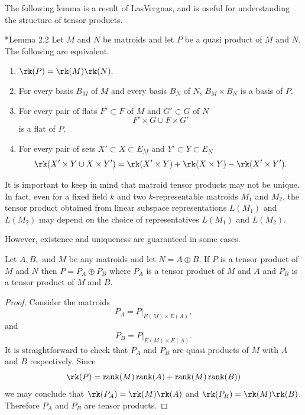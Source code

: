     The following lemma is a result of LasVergnas, and is useful for understanding the structure of tensor products.
    \begin{lemma}\label{lem:tensorCharacterizations}\cite{LV81}*{Lemma 2.2}
    Let $M$ and $N$ be matroids and let $P$ be a quasi product of $M$ and $N$. The following are equivalent.
    \begin{enumerate}
        \item $\rk(P)=\rk(M)\rk(N).$
        \item For every basis $B_M$ of $M$ and every basis $B_N$ of $N$, $B_M\times B_N$ is a basis of $P$.
        \item For every pair of flats $F'\subset F$ of $M$ and $G'\subset G$ of $N$ 
        $$F'\times G \cup F\times G'$$
        is a flat of $P$.
        \item For every pair of sets $X'\subset X\subset E_M$ and $Y'\subset Y\subset E_N$
        $$\rk(X'\times Y\cup X\times Y')= \rk(X'\times Y)+\rk(X\times Y)- \rk(X'\times Y').$$
    \end{enumerate}
    \end{lemma}
    
    It is important to keep in mind that matroid tensor products may not be unique. In fact, even for a fixed field $k$ and two $k$-representable matroids $M_1$ and $M_2$, the tensor product obtained from linear subspace representations $L(M_1)$ and $L(M_2)$ may depend on the choice of representatives $L(M_1)$ and $L(M_2)$. 

    However, existence and uniqueness are guaranteed in some cases.

    \begin{lemma}\label{lem:tensorSums}
     Let $A,B,$ and $M$ be any matroids and let $N=A\oplus B$. If $P$ is a tensor product of $M$ and $N$ then $P= P_A\oplus P_B$ where $P_A$ is a tensor product of $M$ and $A$ and $P_B$ is a tensor product of $M$ and $B$.
    \end{lemma}
    \begin{proof}
        Consider the matroids 
        $$P_A = P|_{E(M)\times E(A)},$$
        and
        $$P_B = P|_{E(M)\times E(A)}.$$
        It is straightforward to check that $P_A$ and $P_B$ are quasi products of $M$ with $A$ and $B$ respectively. Since
        $$\rk(P)=\rank(M)\rank(A)+\rank(M)\rank(B))$$
        we may conclude that $\rk(P_A)=\rk(M)\rk(A)$ and $\rk(P_B)= \rk(M)\rk(B)$. Therefore $P_A$ and $P_B$ are tensor products. 
    \end{proof}

